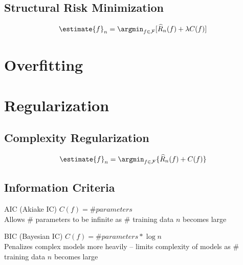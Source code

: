 \documentclass[18pt,a3paper,landscape, ncols=3]{cheatsheet}
\begin{document}
	\subsection{Structural Risk Minimization}
		\begin{mdframed}
			\[
				\estimate{f}_{n} = \argmin_{f \in \mathcal{F}} \lbrack \widehat{R}_{n}(f) + \lambda C(f) \rbrack
			\]
		\end{mdframed}

\section{Overfitting} \seperator
	\begin{mdframed}
	\end{mdframed}

\section{Regularization} \seperator
	\subsection{Complexity Regularization}
		\begin{mdframed}
			\[
				\estimate{f}_{n} = \argmin_{f \in \mathcal{F}} \lbrace \widehat{R}_{n}(f) + C(f) \rbrace
			\]
		\end{mdframed}
	\subsection{Information Criteria}
		\begin{mdframed}
			AIC (Akiake IC) \quad \(C(f) = \# parameters\)\\
			\indent Allows \(\#\) parameters to be infinite as \(\#\) training data \(n\) becomes large
		\end{mdframed}
		\begin{mdframed}
			BIC (Bayesian IC) \quad \(C(f) = \# parameters * \log n\)\\
			\indent Penalizes complex models more heavily -- limits complexity of models as \(\#\) training data \(n\) becomes large
		\end{mdframed}

\end{document}
